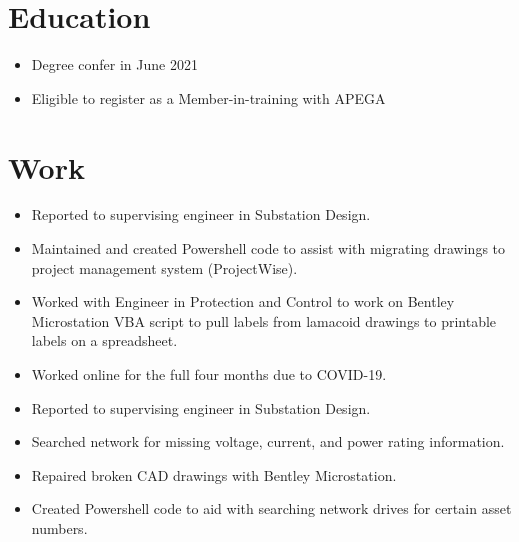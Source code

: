 \documentclass{lsanche_cv}
\begin{document}

\medskip


\smallskip


\begin{multicols*}{2}
  \section{Education}
    \begin{itemize}
      \item Degree confer in June 2021
      \item Eligible to register as a Member-in-training with APEGA
    \end{itemize}

  \section{Work}
    \begin{itemize}
      \item Reported to supervising engineer in Substation Design.
      \item Maintained and created Powershell code to assist with migrating drawings to project management system (ProjectWise).
      \item Worked with Engineer in Protection and Control to work on Bentley Microstation VBA script to pull labels from lamacoid drawings to printable labels on a spreadsheet.
      \item Worked online for the full four months due to COVID-19.
    \end{itemize}

    \divider

    \begin{itemize}
      \item Reported to supervising engineer in Substation Design.
      \item Searched network for missing voltage, current, and power rating information.
      \item Repaired broken CAD drawings with Bentley Microstation.
      \item Created Powershell code to aid with searching network drives for certain asset numbers.
    \end{itemize}


\end{multicols*}
\end{document}
